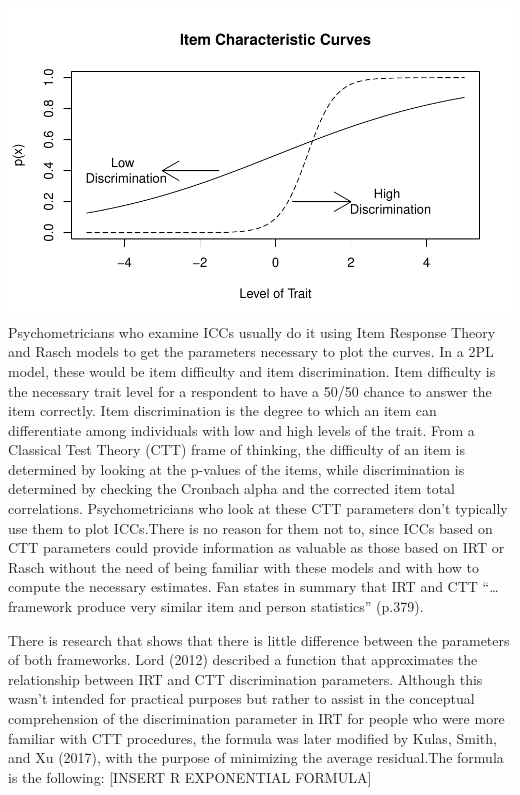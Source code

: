 \documentclass[
  english,
  man,floatsintext]{apa6}
\begin{document}
\includegraphics{ICC_project_files/figure-latex/unnamed-chunk-1-1.pdf}
\newpage
Psychometricians who examine ICCs usually do it using Item Response Theory and Rasch models to get the parameters necessary to plot the curves. In a 2PL model, these would be item difficulty and item discrimination. Item difficulty is the necessary trait level for a respondent to have a 50/50 chance to answer the item correctly. Item discrimination is the degree to which an item can differentiate among individuals with low and high levels of the trait. From a Classical Test Theory (CTT) frame of thinking, the difficulty of an item is determined by looking at the p-values of the items, while discrimination is determined by checking the Cronbach alpha and the corrected item total correlations. Psychometricians who look at these CTT parameters don't typically use them to plot ICCs.There is no reason for them not to, since ICCs based on CTT parameters could provide information as valuable as those based on IRT or Rasch without the need of being familiar with these models and with how to compute the necessary estimates. Fan states in summary that IRT and CTT \enquote{\ldots{} framework produce very similar item and person statistics} (p.379).

There is research that shows that there is little difference between the parameters of both frameworks. Lord (2012) described a function that approximates the relationship between IRT and CTT discrimination parameters. Although this wasn't intended for practical purposes but rather to assist in the conceptual comprehension of the discrimination parameter in IRT for people who were more familiar with CTT procedures, the formula was later modified by Kulas, Smith, and Xu (2017), with the purpose of minimizing the average residual.The formula is the following:
{[}INSERT R EXPONENTIAL FORMULA{]}
\end{document}
